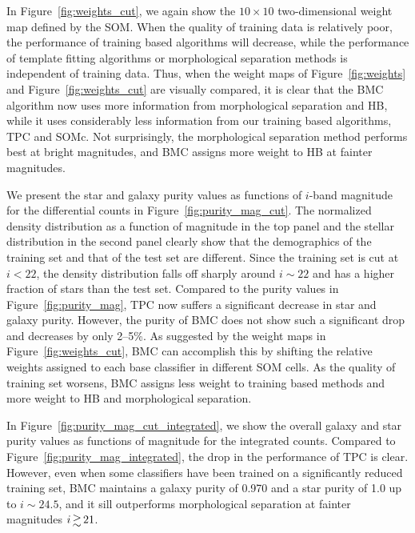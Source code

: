\documentclass[useAMS,usenatbib]{mn2e}
\begin{document}
In Figure~\ref{fig:weights_cut}, we again show the $10\times10$
two-dimensional weight map defined by the SOM.
When the quality of training data is relatively poor,
the performance of training based algorithms will decrease,
while the performance of template fitting algorithms
or morphological separation methods
is independent of training data.
Thus, when the weight maps of Figure~\ref{fig:weights}
and Figure~\ref{fig:weights_cut} are visually compared,
it is clear that
the BMC algorithm now uses more information from
morphological separation and HB,
while it uses considerably less information from 
our training based algorithms, TPC and SOMc.
Not surprisingly, the morphological separation method
performs best at bright magnitudes,
and BMC assigns more weight to HB at fainter magnitudes.

We present the star and galaxy purity values as functions of
$i$-band magnitude for the differential counts
in Figure~\ref{fig:purity_mag_cut}.
The normalized density distribution as a function of magnitude
in the top panel
and the stellar distribution in the second panel
clearly show that the demographics of the training set and 
that of the test set are different.
Since the training set is cut at $i < 22$,
the density distribution falls off sharply around $i \sim 22$
and has a higher fraction of stars than the test set.
Compared to the purity values in Figure~\ref{fig:purity_mag},
TPC now suffers a significant decrease in star and galaxy purity.
However, the purity of BMC does not show such a significant drop
and decreases by only 2--5\%.
As suggested by the weight maps in Figure~\ref{fig:weights_cut},
BMC can accomplish this by shifting the relative weights assigned to
each base classifier in different SOM cells.
As the quality of training set worsens,
BMC assigns less weight to training based methods
and more weight to HB and morphological separation.

In Figure~\ref{fig:purity_mag_cut_integrated}, we show
the overall galaxy and star purity values as functions of magnitude
for the integrated counts.
Compared to Figure~\ref{fig:purity_mag_integrated},
the drop in the performance of TPC is clear.
However, even when some classifiers have been trained on
a significantly reduced training set,
BMC maintains a galaxy purity of 0.970 and a star purity of 1.0
up to $i \sim 24.5$, and it sill outperforms morphological separation
at fainter magnitudes $i \ga 21$.
\end{document}
